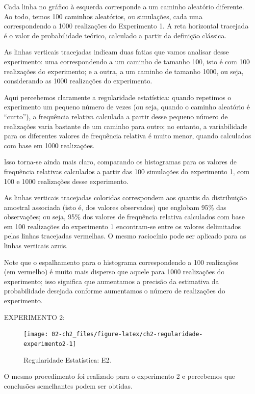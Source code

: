 \documentclass[
]{book}
\theoremstyle{definition}
\theoremstyle{definition}
\theoremstyle{definition}
\theoremstyle{remark}
\begin{document}
Cada linha no gráfico à esquerda corresponde a um caminho aleatório diferente. Ao todo, temos 100 caminhos aleatórios, ou simulações, cada uma correspondendo a 1000 realizações do Experimento 1. A reta horizontal tracejada é o valor de probabilidade teórico, calculado a partir da definição clássica.

As linhas verticais tracejadas indicam duas fatias que vamos analisar desse experimento: uma correspondendo a um caminho de tamanho 100, isto é com 100 realizações do experimento; e a outra, a um caminho de tamanho 1000, ou seja, considerando as 1000 realizações do experimento.

Aqui percebemos claramente a regularidade estatística: quando repetimos o experimento um pequeno número de vezes (ou seja, quando o caminho aleatório é ``curto''), a frequência relativa calculada a partir desse pequeno número de realizações varia bastante de um caminho para outro; no entanto, a variabilidade para os diferentes valores de frequência relativa é muito menor, quando calculados com base em 1000 realizações.

Isso torna-se ainda mais claro, comparando os histogramas para os valores de frequência relativas calculados a partir das 100 simulações do experimento 1, com 100 e 1000 realizações desse experimento.

As linhas verticais tracejadas coloridas correspondem aos quantis da distribuição amostral associada (isto é, dos valores observados) que englobam 95\% das observações; ou seja, 95\% dos valores de frequência relativa calculados com base em 100 realizações do experimento 1 encontram-se entre os valores delimitados pelas linhas tracejadas vermelhas. O mesmo raciocínio pode ser aplicado para as linhas verticais azuis.

Note que o espalhamento para o histograma correspondendo a 100 realizações (em vermelho) é muito mais disperso que aquele para 1000 realizações do experimento; isso significa que aumentamos a precisão da estimativa da probabilidade desejada conforme aumentamos o número de realizações do experimento.

EXPERIMENTO 2:

\begin{figure}
\texttt{[image: 02-ch2\_files/figure-latex/ch2-regularidade-experimento2-1]} \caption{Regularidade Estatística: E2.}\label{fig:ch2-regularidade-experimento2}
\end{figure}

O mesmo procedimento foi realizado para o experimento 2 e percebemos que
conclusões semelhantes podem ser obtidas.
\end{document}
